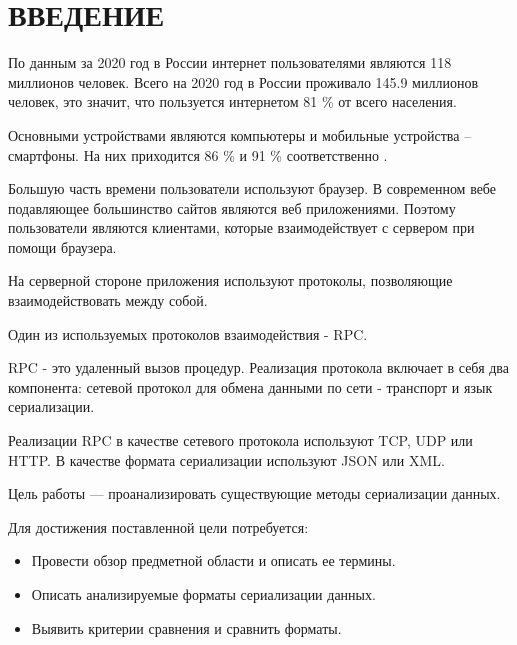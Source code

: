 \chapter*{ВВЕДЕНИЕ}

По данным за 2020 год в России интернет пользователями являются 118 миллионов человек. Всего на 2020 год в России проживало 145.9 миллионов человек, это значит, что пользуется интернетом 81 \% от всего населения.  

Основными устройствами являются компьютеры и мобильные устройства -- смартфоны. На них приходится 86 \% и 91 \% соответственно \cite{russian-users-stat}.

Большую часть времени пользователи используют браузер.
В современном вебе подавляющее большинство сайтов являются веб приложениями. Поэтому пользователи являются клиентами, которые взаимодействует с сервером при помощи браузера.

На серверной стороне приложения используют протоколы, позволяющие взаимодействовать между собой. 

Один из используемых протоколов взаимодействия - RPC.

RPC - это удаленный вызов процедур. Реализация протокола включает в себя два компонента: сетевой протокол для обмена данными по сети - транспорт и язык сериализации.  

Реализации RPC в качестве сетевого протокола используют TCP, UDP или HTTP.  
В качестве формата сериализации используют JSON или XML.

Цель работы --- проанализировать существующие методы сериализации данных.

Для достижения поставленной цели потребуется:
\begin{itemize}
\item Провести обзор предметной области и описать ее термины.
\item Описать анализируемые форматы сериализации данных.
\item Выявить критерии сравнения и сравнить форматы.
\end{itemize}
